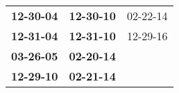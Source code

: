 \begin{supertabular}{p{0.33\columnwidth}p{0.33\columnwidth}p{0.33\columnwidth}}
 \textbf{12-30-04\textsuperscript{}} &  \textbf{12-30-10\textsuperscript{}} &  02-22-14\textsuperscript{} \\
 \textbf{12-31-04\textsuperscript{}} &  \textbf{12-31-10\textsuperscript{}} &  12-29-16\textsuperscript{} \\
 \textbf{03-26-05\textsuperscript{}} &  \textbf{02-20-14\textsuperscript{}} &                             \\
 \textbf{12-29-10\textsuperscript{}} &  \textbf{02-21-14\textsuperscript{}} &                             \\
\end{supertabular}
